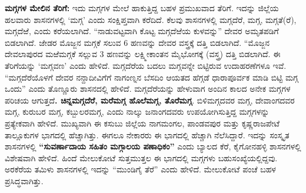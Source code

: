 \textbf{ಮಗ್ಗಗಳ ಮೇಲಿನ ತೆರಿಗೆ:} ಇದು ಮಗ್ಗಗಳ ಮೇಲೆ ಹಾಕುತ್ತಿದ್ದ ಬಹಳ ಪ್ರಮುಖವಾದ ತೆರಿಗೆ. ಇದನ್ನು ಜಿಲ್ಲೆಯ ಹಲವಾರು ಶಾಸನಗಳಲ್ಲಿ ‘ಮಗ್ಗ’ ಎಂದು ಸಂಕ್ಷಿಪ್ತವಾಗಿ ಕರೆದಿದೆ. ಕೆಲವು ಶಾಸನಗಳಲ್ಲಿ ಮಗ್ಗದೆರೆ, ಮಗ್ಗ, ಮಗ್ಗತೆ(ರೆ), ಮಗ್ಗದೆಱೆ, ಎಂದು ಕರೆಯಲಾಗಿದೆ. “ನಾಡುವಟ್ಟವಾಗಿ ಕೊಟ್ಟ ಮಗ್ಗದೆಱೆಯ ಕುಳವನ್ನು” ದೇವರ ಅಮೃತಪಡಿಗೆ ಬಿಡಲಾಗಿದೆ. ಜೇಡರ ಮೊಜ್ಜನ ಮಗ್ಗಕೆ ಸಲುವ 6 ಹಣವನ್ನು ದೇವರ ವಸ್ತ್ರಕ್ಕೆ ದತ್ತಿ ಬಿಡಲಾಗಿದೆ. “ಮೊಜ್ಜನ ದೇವಲಾಪುರದ ಮಱೆಮಗ್ಗಕೆ ಸಲ್ಲುವ 3 ಹಣವನ್ನು ಲಕ್ಷ್ಮೀಕಾಂತನ ಮೈಭೋಗಕ್ಕೆ (ವಸ್ತ್ರ) ದತ್ತಿ ಬಿಡಲಾಗಿದೆ. ಈ ತೆರಿಗೆಯನ್ನು ‘ಮಗ್ಗವಣ’ ಎಂದು ಹೇಳಿದೆ. ಮಗ್ಗದೆರೆಯ ಬದಲು ಮಗ್ಗವನ್ನೇ ಬಿಟ್ಟಿರುವ ಉದಾಹರಣೆಗಳೂ ಇವೆ. “ಮಗ್ಗದೆರೆಯೊಳಗೆ ದೇವರ ನನ್ದಾದೀವಿಗೆಗೆ ನಾಗಂಣ್ನನ ಬೆಸದಿಂ ಆಯತದ ಹೆಗ್ಗಡೆ ಧಾರಾಪೂರ್ವಕ ಮಾಡಿ ಬಿಟ್ಟಿ ಮಗ್ಗ ಒಂದು” ಎಂದು ತೊಣ್ಣೂರು ಶಾಸನದಲ್ಲಿ ಹೇಳಿದೆ. ಮಗ್ಗದೆರೆಯನ್ನು ಹೇಳುವಾಗ ಅಂದಿನ ಕಾಲದ ಅನೇಕ ಮಗ್ಗಗಳ ಪರಿಚಯ ಆಗುತ್ತದೆ\textbf{. ಚಿನ್ನಮಗ್ಗದೆರೆ, ಮರೆಮಗ್ಗ ಹೊಲೆಮಗ್ಗ, ತೊರೆಮಗ್ಗ}. ಬಿಳಿಮಗ್ಗದವರ ಮಗ್ಗ, ದೇವಾಂಗದವರ ಮಗ್ಗ, ಕುರುಬರ ಮಗ್ಗ, ಕಬ್ಬುಲರಮಗ್ಗ, ಎಂದು ನಾಲ್ಕು ಜನಾಂಗದವರು ಉಪಯೋಗಿಸುತ್ತಿದ್ದ ಮಗ್ಗಗಳನ್ನು ಪ್ರತ್ಯೇಕವಾಗಿ ಹೇಳಿದೆ. ಮುಖ್ಯವಾಗಿ ಈ ಕಸುಬು ಜಿಲ್ಲೆಯ ನಾಗಮಂಗಲ, ಪಾಂಡವಪುರ ಮತ್ತು ಕೃಷ್ಣರಾಜಪೇಟೆ ತಾಲ್ಲೂಕುಗಳ ಭಾಗದಲ್ಲಿ ಹೆಚ್ಚಾಗಿತ್ತು. ಈಗಲೂ ನೇಕಾರರು ಈ ಭಾಗದಲ್ಲಿ ಹೆಚ್ಚಾಗಿ ನೆಲೆಸಿದ್ದಾರೆ. ಇದನ್ನು ಸಂಸ್ಕೃತ ಶಾಸನಗಳಲ್ಲಿ \textbf{“ಸುವರ್ಣಾದಾಯ ಸಹಿತಂ ಮಗ್ಗಾಲಯ ಪಣಾಧಿಕಂ”} ಎಂದು ಬ್ಯಾಲದ ಕೆರೆ, ಕೈಗೋನಹಳ್ಳಿ ಶಾಸನಗಳಲ್ಲಿ ವಿಶೇಷವಾಗಿ ಹೇಳಿದೆ. ಹಿಂದೆ ಮೇಲುಕೋಟೆ ಸುತ್ತಮುತ್ತಲ ಈ ಭಾಗದಲ್ಲಿ ಮಗ್ಗಗಳು ಬಹುಸಂಖ್ಯೆಯಲ್ಲಿದ್ದವು. ಅರಕೆರೆಯ ತಮಿಳು ಶಾಸನಗಳಲ್ಲಿ ಇದನ್ನು “ಮುಂಡಿಗೈ ತೆರೆ” ಎಂದು ಹೇಳಿದೆ. ಮೇಲುಕೋಟೆ ಪಂಚೆ ಬಹಳ ಪ್ರಸಿದ್ಧವಾಗಿತ್ತು.

